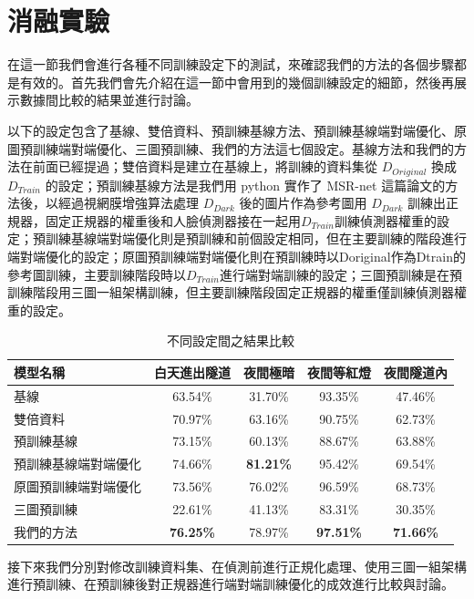 \section{消融實驗}

在這一節我們會進行各種不同訓練設定下的測試，來確認我們的方法的各個步驟都是有效的。首先我們會先介紹在這一節中會用到的幾個訓練設定的細節，然後再展示數據間比較的結果並進行討論。

以下的設定包含了基線、雙倍資料、預訓練基線方法、預訓練基線端對端優化、原圖預訓練端對端優化、三圖預訓練、我們的方法這七個設定。基線方法和我們的方法在前面已經提過；雙倍資料是建立在基線上，將訓練的資料集從 $D_{Original}$ 換成 $D_{Train}$ 的設定；預訓練基線方法是我們用 python 實作了 MSR-net 這篇論文的方法後，以經過視網膜增強算法處理 $D_{Dark}$ 後的圖片作為參考圖用 $D_{Dark}$ 訓練出正規器，固定正規器的權重後和人臉偵測器接在一起用$D_{Train}$訓練偵測器權重的設定；預訓練基線端對端優化則是預訓練和前個設定相同，但在主要訓練的階段進行端對端優化的設定；原圖預訓練端對端優化則在預訓練時以Doriginal作為Dtrain的參考圖訓練，主要訓練階段時以$D_{Train}$進行端對端訓練的設定；三圖預訓練是在預訓練階段用三圖一組架構訓練，但主要訓練階段固定正規器的權重僅訓練偵測器權重的設定。
\begin{table}[ht]
    \caption{不同設定間之結果比較}
    \centering
    \begin{tabular}{l c c c c}
        \hline
        模型名稱 & 白天進出隧道 & 夜間極暗 & 夜間等紅燈 & 夜間隧道內 \\
        \hline
        基線 & 63.54\% & 31.70\% & 93.35\% & 47.46\% \\
        雙倍資料 & 70.97\% & 63.16\% & 90.75\% & 62.73\% \\
        預訓練基線 & 73.15\% & 60.13\% & 88.67\% & 63.88\% \\
        預訓練基線端對端優化 & 74.66\% & \textbf{81.21\%} &95.42\% & 69.54\% \\
        原圖預訓練端對端優化 & 73.56\% & 76.02\% & 96.59\% & 68.73\% \\
        三圖預訓練 & 22.61\% & 41.13\% & 83.31\% & 30.35\% \\
        我們的方法 & \textbf{76.25\%} & 78.97\% & \textbf{97.51\%} & \textbf{71.66\%} \\
        \hline
    \end{tabular}
    \label{table:all_compare}
\end{table}
接下來我們分別對修改訓練資料集、在偵測前進行正規化處理、使用三圖一組架構進行預訓練、在預訓練後對正規器進行端對端訓練優化的成效進行比較與討論。

